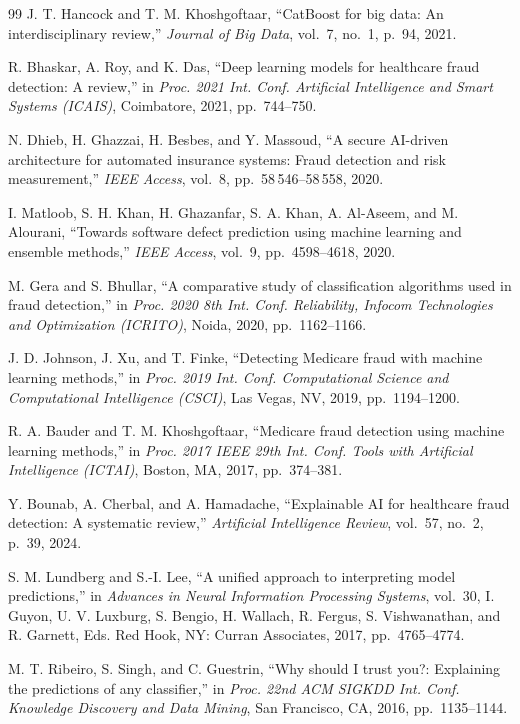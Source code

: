 \begin{thebibliography}{99}
J. T. Hancock and T. M. Khoshgoftaar,
``CatBoost for big data: An interdisciplinary review,''
\textit{Journal of Big Data},
vol.~7, no.~1, p.~94, 2021.

R. Bhaskar, A. Roy, and K. Das,
``Deep learning models for healthcare fraud detection: A review,''
in \textit{Proc. 2021 Int. Conf. Artificial Intelligence and Smart Systems (ICAIS)},
Coimbatore, 2021, pp.~744--750.

N. Dhieb, H. Ghazzai, H. Besbes, and Y. Massoud,
``A secure AI-driven architecture for automated insurance systems: Fraud detection and risk measurement,''
\textit{IEEE Access},
vol.~8, pp.~58\,546--58\,558, 2020.

I. Matloob, S. H. Khan, H. Ghazanfar, S. A. Khan, A. Al-Aseem, and M. Alourani,
``Towards software defect prediction using machine learning and ensemble methods,''
\textit{IEEE Access},
vol.~9, pp.~4598--4618, 2020.

M. Gera and S. Bhullar,
``A comparative study of classification algorithms used in fraud detection,''
in \textit{Proc. 2020 8th Int. Conf. Reliability, Infocom Technologies and Optimization (ICRITO)},
Noida, 2020, pp.~1162--1166.

J. D. Johnson, J. Xu, and T. Finke,
``Detecting Medicare fraud with machine learning methods,''
in \textit{Proc. 2019 Int. Conf. Computational Science and Computational Intelligence (CSCI)},
Las Vegas, NV, 2019, pp.~1194--1200.

R. A. Bauder and T. M. Khoshgoftaar,
``Medicare fraud detection using machine learning methods,''
in \textit{Proc. 2017 IEEE 29th Int. Conf. Tools with Artificial Intelligence (ICTAI)},
Boston, MA, 2017, pp.~374--381.

Y. Bounab, A. Cherbal, and A. Hamadache,
``Explainable AI for healthcare fraud detection: A systematic review,''
\textit{Artificial Intelligence Review},
vol.~57, no.~2, p.~39, 2024.

S. M. Lundberg and S.-I. Lee,
``A unified approach to interpreting model predictions,''
in \textit{Advances in Neural Information Processing Systems},
vol.~30, I. Guyon, U. V. Luxburg, S. Bengio, H. Wallach, R. Fergus, S. Vishwanathan, and R. Garnett, Eds.
Red Hook, NY: Curran Associates, 2017, pp.~4765--4774.

M. T. Ribeiro, S. Singh, and C. Guestrin,
``Why should I trust you?: Explaining the predictions of any classifier,''
in \textit{Proc. 22nd ACM SIGKDD Int. Conf. Knowledge Discovery and Data Mining},
San Francisco, CA, 2016, pp.~1135--1144.


\end{thebibliography}
